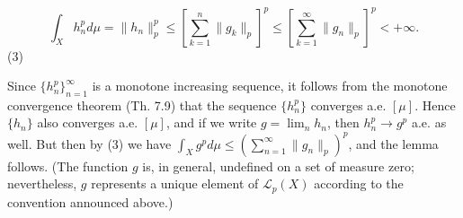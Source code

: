 $$\int_X h_n^p d\mu = \|h_n\|_p^p \leq \left[ \sum_{k=1}^n \|g_k\|_p \right]^p \leq \left[ \sum_{k=1}^{\infty} \|g_n\|_p \right]^p < +\infty.$$ (3)

Since $\{h_n^p\}_{n=1}^{\infty}$ is a monotone increasing sequence, it follows from the monotone convergence theorem (Th. 7.9) that the sequence $\{h_n^p\}$ converges a.e. $[\mu]$.
Hence $\{h_n\}$ also converges a.e. $[\mu]$, and if we write $g = \lim_n h_n$, then $h_n^p \rightarrow g^p$ a.e. as well. But then by (3) we have $\int_X g^p d\mu \leq \left( \sum_{n=1}^{\infty} \|g_n\|_p \right)^p$, and the lemma follows. (The function $g$ is, in general, undefined on a set of measure zero; nevertheless, $g$ represents a unique element of $\mathcal{L}_p(X)$ according to the convention announced above.)
